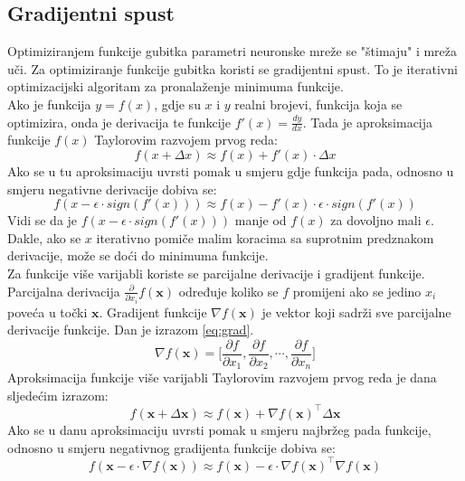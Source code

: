 \documentclass[times, utf8, zavrsni, numeric]{fer}
\renewcommand{\vec}[1]{\mathbf{#1}}
\begin{document}
\subsection{Gradijentni spust}
Optimiziranjem funkcije gubitka parametri neuronske mreže se "štimaju" i mreža 
uči. Za optimiziranje funkcije gubitka koristi se gradijentni spust.
To je iterativni optimizacijski algoritam za pronalaženje minimuma funkcije.
\\\indent Ako je funkcija $y = f({x})$, gdje su $x$ i $y$ realni brojevi, 
funkcija koja se optimizira, onda je derivacija te funkcije 
$f'(x) = \frac{dy}{dx}$. Tada je aproksimacija funkcije $f(x)$ Taylorovim 
razvojem prvog reda:
\begin{equation}
	f(x+\Delta x) \approx f(x) + f'(x)\cdot \Delta x
\end{equation}
Ako se u tu aproksimaciju uvrsti pomak u smjeru gdje funkcija pada, odnosno u
smjeru negativne derivacije dobiva se:
\begin{equation}
	f(x -\epsilon \cdot sign(f'(x))) \approx f(x) - f'(x)\cdot\epsilon \cdot 
	sign(f'(x))
\end{equation}
Vidi se da je $f(x -\epsilon \cdot sign(f'(x)))$ manje od $f(x)$ za dovoljno
mali $\epsilon$. Dakle, ako se $x$ iterativno pomiče malim koracima sa
suprotnim predznakom derivacije, može se doći do minimuma funkcije.
\\\indent Za funkcije više varijabli koriste se parcijalne derivacije i 
gradijent funkcije. Parcijalna derivacija $\frac{\partial}{\partial x_i}
f(\vec{x})$ određuje koliko se $f$ promijeni ako se jedino $x_i$ poveća u 
točki $\vec{x}$. Gradijent funkcije $\nabla f(\vec{x})$ je vektor koji 
sadrži sve parcijalne derivacije funkcije. Dan je izrazom \ref{eq:grad}.
\begin{equation}
	\nabla f(\vec{x}) = \bigg[\frac{\partial f}{\partial x_1},
	\frac{\partial f}{\partial x_2}, \cdots ,
	\frac{\partial f}{\partial x_n}\bigg]
	\label{eq:grad}
\end{equation}
Aproksimacija funkcije više varijabli Taylorovim razvojem prvog reda je dana
sljedećim izrazom:
\begin{equation}
	f(\vec{x} + \Delta \vec{x}) \approx f(\vec{x}) + \nabla f(\vec{x})^\top
	\Delta \vec{x}
\end{equation}
Ako se u danu aproksimaciju uvrsti pomak u smjeru najbržeg pada funkcije, 
odnosno u smjeru negativnog gradijenta funkcije dobiva se:
\begin{equation}
	f(\vec{x} - \epsilon \cdot \nabla f(\vec{x})) \approx f(\vec{x}) - \epsilon
	\cdot \nabla f(\vec{x})^\top \nabla f(\vec{x})
\end{equation}
\end{document}
